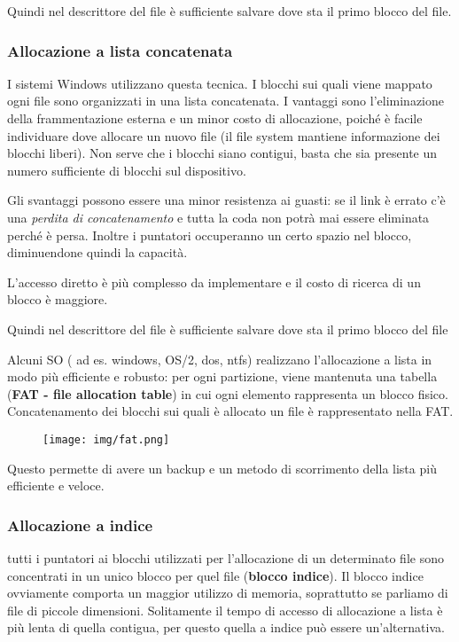 \documentclass{article}
\begin{document}
 \noindent Quindi nel descrittore del file è sufficiente salvare
 dove sta il primo blocco del file.

 \subsubsection{Allocazione a lista concatenata}
I sistemi Windows utilizzano questa tecnica.
I blocchi sui quali viene mappato ogni file sono organizzati
 in una lista concatenata. I vantaggi sono l'eliminazione
 della frammentazione esterna e un minor costo di allocazione,
 poiché è facile individuare dove allocare un nuovo file (il 
 file system mantiene informazione dei blocchi liberi).
 Non serve che i blocchi siano contigui, basta che sia presente un 
 numero sufficiente di blocchi sul dispositivo.

 \noindent Gli svantaggi possono essere una minor resistenza ai guasti:
 se il link è errato c'è una \textit{perdita di concatenamento} e 
 tutta la coda non potrà mai essere eliminata perché è persa.
 Inoltre i puntatori occuperanno un certo spazio nel blocco,
 diminuendone quindi la capacità. 
 
 \noindent L'accesso diretto è più complesso da implementare e
 il costo di ricerca di un blocco è maggiore. 
\medskip 

\noindent Quindi nel descrittore del file è sufficiente salvare
 dove sta il primo blocco del file
\medskip

\noindent Alcuni SO ( ad es. windows, OS/2, dos, ntfs) realizzano 
l'allocazione a lista in modo più efficiente e robusto:
per ogni partizione, viene mantenuta una tabella (\textbf{FAT -
file allocation table}) in cui 
ogni elemento rappresenta un blocco fisico. Concatenamento dei
 blocchi sui quali è allocato un file è rappresentato nella FAT.


\begin{figure}[h!]
        \begin{center}
            \texttt{[image: img/fat.png]}      
        \end{center}
    \end{figure}

\noindent Questo permette di avere un backup e un metodo 
di scorrimento della lista più efficiente e veloce.

\subsubsection{Allocazione a indice}
tutti i puntatori ai blocchi utilizzati per l'allocazione
 di un determinato file sono concentrati in un unico
blocco per quel file (\textbf{blocco indice}). Il blocco indice
ovviamente comporta un maggior utilizzo di memoria, soprattutto se 
parliamo di file di piccole dimensioni. Solitamente il tempo di accesso
 di allocazione a lista è più lenta di quella contigua,
per questo quella a indice può essere un'alternativa.
\end{document}
